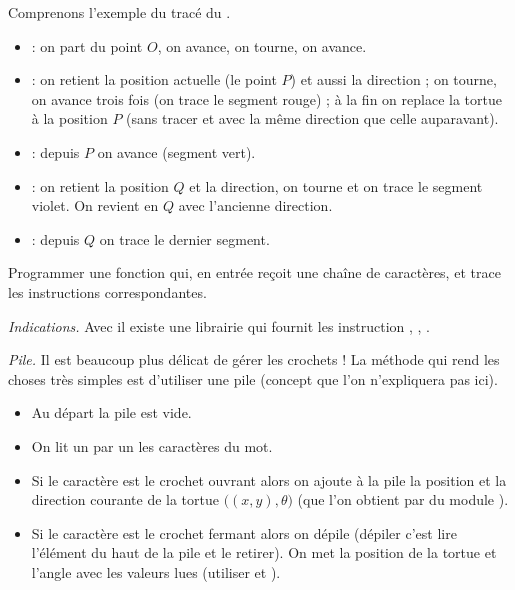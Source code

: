 \documentclass[11pt,class=report,crop=false]{standalone}
\begin{document}
\begin{exemple}
Comprenons l'exemple du tracé du 
. 
\begin{itemize}
  \item {} : on part du point $O$, on avance, on tourne, on avance.
  \item \mot{{\color{red}[+FFF]}} : on retient la position actuelle (le point $P$) et aussi la direction ; on tourne, on avance trois fois (on trace le segment rouge) ; à la fin on replace la tortue à la position $P$ (sans tracer et avec la même direction que celle auparavant).
  \item {} : depuis $P$ on avance (segment vert).
  \item \mot{{\color{purple}[-FF]}} : on retient la position $Q$ et la direction, on tourne et on trace le segment violet. On revient en $Q$ avec l'ancienne direction.
  \item {} : depuis $Q$ on trace le dernier segment.
\end{itemize}
\end{exemple}


\begin{exercicecours}
Programmer une fonction qui, en entrée reçoit une chaîne de caractères, et trace les instructions correspondantes.

\emph{Indications.}
Avec \Python{} il existe une librairie  qui fournit les instruction , , .

\emph{Pile.}
Il est beaucoup plus délicat de gérer les crochets ! La méthode qui rend les choses très simples est d'utiliser une \og{}pile\fg{} (concept que l'on n'expliquera pas ici). 
  \begin{itemize}
    \item Au départ la pile est vide.
	\item On lit un par un les caractères du mot.
	\item Si le caractère est le crochet ouvrant \og{}\mot{[}\fg{} alors on ajoute à la pile la position et la direction courante de la tortue $\big( (x,y), \theta\big)$ (que l'on obtient par  du module ).
	
	\item Si le caractère est le crochet fermant \og{}\mot{]}\fg{} alors on dépile
	(dépiler c'est lire l'élément du haut de la pile et le retirer). On met la position de la tortue et l'angle avec les valeurs lues (utiliser  et ).
	
	\end{itemize}
\end{exercicecours}
\end{document}
